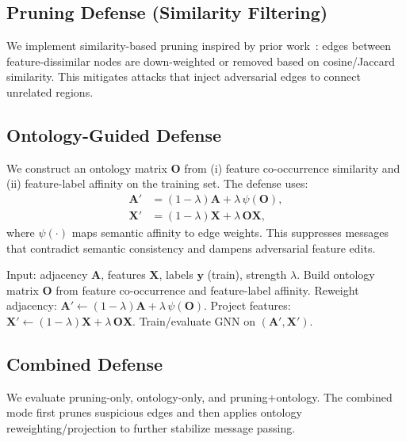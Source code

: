 \documentclass[conference]{IEEEtran}
\begin{document}
\subsection{Pruning Defense (Similarity Filtering)}
We implement similarity-based pruning inspired by prior work~\cite{wu2019jaccard,zhang2020gnnguard}: edges between feature-dissimilar nodes are down-weighted or removed based on cosine/Jaccard similarity. This mitigates attacks that inject adversarial edges to connect unrelated regions.

\subsection{Ontology-Guided Defense}
We construct an ontology matrix $\mathbf{O}$ from (i) feature co-occurrence similarity and (ii) feature-label affinity on the training set. The defense uses:
\begin{align}
\mathbf{A}' &= (1-\lambda)\mathbf{A}+\lambda\,\psi(\mathbf{O}), \\
\mathbf{X}' &= (1-\lambda)\mathbf{X}+\lambda\,\mathbf{O}\mathbf{X},
\end{align}
where $\psi(\cdot)$ maps semantic affinity to edge weights. This suppresses messages that contradict semantic consistency and dampens adversarial feature edits.

\begin{algorithm}[t]
\caption{Ontology-Guided Defense (Adjacency Reweighting + Feature Projection)}
\label{alg:ontology}
\begin{algorithmic}[1]
\STATE Input: adjacency $\mathbf{A}$, features $\mathbf{X}$, labels $\mathbf{y}$ (train), strength $\lambda$.
\STATE Build ontology matrix $\mathbf{O}$ from feature co-occurrence and feature-label affinity.
\STATE Reweight adjacency: $\mathbf{A}' \leftarrow (1-\lambda)\mathbf{A} + \lambda\,\psi(\mathbf{O})$.
\STATE Project features: $\mathbf{X}' \leftarrow (1-\lambda)\mathbf{X} + \lambda\,\mathbf{O}\mathbf{X}$.
\STATE Train/evaluate GNN on $(\mathbf{A}',\mathbf{X}')$.
\end{algorithmic}
\end{algorithm}

\subsection{Combined Defense}
We evaluate pruning-only, ontology-only, and pruning+ontology. The combined mode first prunes suspicious edges and then applies ontology reweighting/projection to further stabilize message passing.
\end{document}
